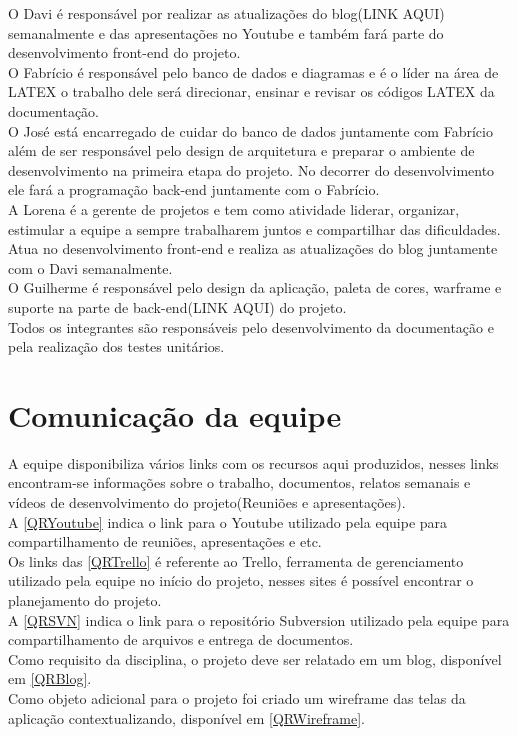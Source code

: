 O Davi é responsável por realizar as atualizações do blog(LINK AQUI) semanalmente e das apresentações no Youtube e também fará parte do desenvolvimento front-end do projeto.\\ 
O Fabrício é responsável pelo banco de dados e diagramas e é o líder na área de LATEX o trabalho dele será direcionar, ensinar e revisar os códigos LATEX da documentação. \\
O José está encarregado de cuidar do banco de dados juntamente com Fabrício além de ser responsável pelo design de arquitetura e preparar o ambiente de desenvolvimento na primeira etapa do projeto. No decorrer do desenvolvimento ele fará a programação back-end juntamente com o Fabrício.  \\
A Lorena é a gerente de projetos e tem como atividade liderar, organizar, estimular a equipe a sempre trabalharem juntos e compartilhar das dificuldades. Atua no desenvolvimento front-end e realiza as atualizações do blog juntamente com o Davi semanalmente. \\
O Guilherme é responsável pelo design da aplicação, paleta de cores, warframe e suporte na parte de back-end(LINK AQUI) do projeto.\\
Todos os integrantes são responsáveis pelo desenvolvimento da documentação e pela realização dos testes unitários.
\\

\section{Comunicação da equipe}
A equipe disponibiliza vários links com os recursos aqui produzidos, nesses links encontram-se informações sobre o trabalho, documentos, relatos semanais e vídeos de desenvolvimento do projeto(Reuniões e apresentações).  \\
	A \ref{QRYoutube} indica o link para o Youtube utilizado pela equipe para compartilhamento de reuniões, apresentações e etc.\\
Os links das \ref{QRTrello} é referente ao Trello, ferramenta de gerenciamento utilizado pela equipe no início do projeto, nesses sites é possível encontrar o planejamento do projeto.\\
A \ref{QRSVN} indica o link para o repositório Subversion utilizado pela equipe para compartilhamento de arquivos e entrega de documentos.\\
Como requisito da disciplina, o projeto deve ser relatado em um blog, disponível em \ref{QRBlog}.\\
Como objeto adicional para o projeto foi criado um wireframe das telas da aplicação contextualizando, disponível em \ref{QRWireframe}.\\

